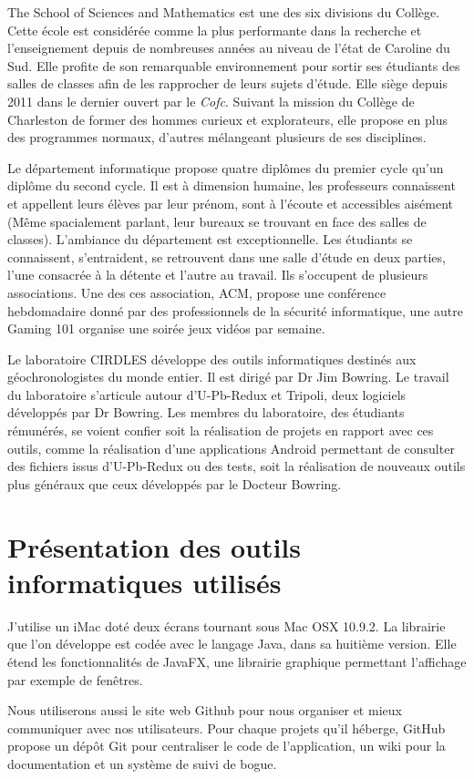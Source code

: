 The School of Sciences and Mathematics est une des six divisions du Collège. Cette école est considérée comme la plus performante dans la recherche et l’enseignement depuis de nombreuses années au niveau de l’état de Caroline du Sud. Elle profite de son remarquable environnement pour sortir ses étudiants des salles de classes afin de les rapprocher de leurs sujets d’étude. Elle siège depuis 2011 dans le dernier ouvert par le \textit{Cofc}. Suivant la mission du Collège de Charleston de former des hommes curieux et explorateurs, elle propose en plus des programmes normaux, d’autres mélangeant plusieurs de ses disciplines.

Le département informatique propose quatre diplômes du premier cycle  qu’un diplôme du second cycle. Il est à dimension humaine, les professeurs connaissent et appellent leurs élèves par leur prénom, sont à l’écoute et accessibles aisément (Même spacialement parlant, leur bureaux se trouvant en face des salles de classes).
L’ambiance du département est exceptionnelle. Les étudiants se connaissent, s’entraident, se retrouvent dans une salle d’étude en deux parties, l'une consacrée à la détente et l’autre au travail. Ils s'occupent de plusieurs associations. Une des ces association, ACM, propose une conférence hebdomadaire donné par des professionnels de la sécurité informatique, une autre Gaming 101 organise une soirée jeux vidéos par semaine.

Le laboratoire CIRDLES développe des outils informatiques destinés aux géochronologistes du monde entier. Il est dirigé par Dr Jim Bowring. Le travail du laboratoire s’articule autour d’U-Pb-Redux et Tripoli, deux logiciels développés par Dr Bowring. Les membres du laboratoire, des étudiants rémunérés, se voient confier soit la réalisation de projets en rapport avec ces outils, comme la réalisation d’une applications Android permettant de consulter des fichiers issus d’U-Pb-Redux ou des tests, soit la réalisation de nouveaux outils plus généraux que ceux développés par le Docteur Bowring.

\section{Présentation des outils informatiques utilisés}

J’utilise un iMac doté deux écrans tournant sous Mac OSX 10.9.2. La librairie que l’on développe est codée avec le langage Java, dans sa huitième version. Elle étend les fonctionnalités de JavaFX, une librairie graphique permettant l’affichage par exemple de fenêtres.

Nous utiliserons aussi le site web Github pour nous organiser et mieux communiquer avec nos utilisateurs. Pour chaque projets qu'il héberge, GitHub propose un dépôt Git pour centraliser le code de l’application, un wiki pour la documentation et un système de suivi de bogue.
